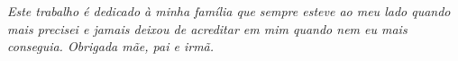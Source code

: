 \begin{dedicatoria}
   \vspace*{\fill}
   \centering
   \noindent

   \textit{Este trabalho é dedicado à minha família que sempre esteve ao meu lado quando mais precisei e jamais deixou de acreditar em mim quando nem eu mais conseguia. Obrigada mãe, pai e irmã.} \vspace*{\fill}
\end{dedicatoria}
